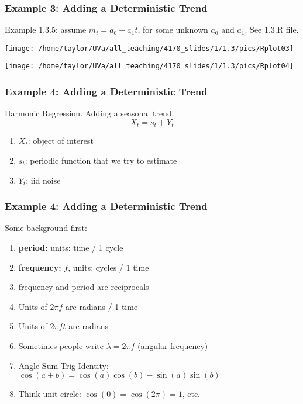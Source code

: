 \documentclass{beamer}
\begin{document}

\begin{frame}[fragile]
\frametitle{Example 3: Adding a Deterministic Trend}

Example 1.3.5: assume $m_t = a_0 + a_1t$, for some unknown $a_0$ and $a_1$. See 1.3.R file.\\

\begin{center}
\texttt{[image: /home/taylor/UVa/all\_teaching/4170\_slides/1/1.3/pics/Rplot03]}
\end{center}
\begin{center}
\texttt{[image: /home/taylor/UVa/all\_teaching/4170\_slides/1/1.3/pics/Rplot04]}
\end{center}
\end{frame}

\begin{frame}[fragile]
\frametitle{Example 4: Adding a Deterministic Trend}

Harmonic Regression. Adding a seasonal trend.
\[
X_t = s_t + Y_t
\]

\begin{enumerate}
\item $X_t$: object of interest
\item $s_t$: periodic function that we try to estimate
\item $Y_t$: iid noise
\end{enumerate}
\end{frame}


\begin{frame}[fragile]
\frametitle{Example 4: Adding a Deterministic Trend}

Some background first:
\begin{enumerate}
\item {\bf period:} units: time / 1 cycle
\item {\bf frequency:} $f$, units: cycles / 1 time
\item frequency and period are reciprocals
\item Units of $2\pi f $ are radians / 1 time
\item Units of $2 \pi f t$ are radians
\item Sometimes people write $\lambda = 2 \pi f$ (angular frequency)
\item Angle-Sum Trig Identity: $\cos(a + b) = \cos(a) \cos(b) - \sin(a) \sin(b)$
\item Think unit circle: $\cos(0) = \cos(2\pi) = 1$, etc.
\end{enumerate}
\end{frame}
\end{document}
